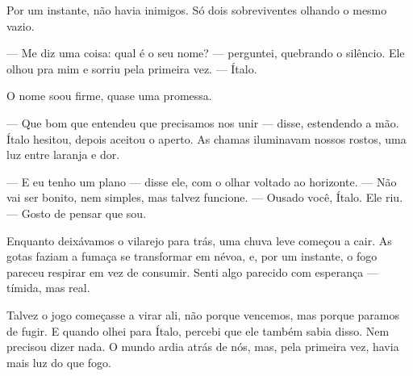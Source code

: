 Por um instante, não havia inimigos.  
Só dois sobreviventes olhando o mesmo vazio.

— Me diz uma coisa: qual é o seu nome? — perguntei, quebrando o silêncio.
Ele olhou pra mim e sorriu pela primeira vez.  
— Ítalo.

O nome soou firme, quase uma promessa.

— Que bom que entendeu que precisamos nos unir — disse, estendendo a mão.  
Ítalo hesitou, depois aceitou o aperto.
As chamas iluminavam nossos rostos, uma luz entre laranja e dor.

— E eu tenho um plano — disse ele, com o olhar voltado ao horizonte. — Não vai ser bonito, nem simples, mas talvez funcione.  
— Ousado você, Ítalo.  
Ele riu. — Gosto de pensar que sou.

Enquanto deixávamos o vilarejo para trás, uma chuva leve começou a cair.  
As gotas faziam a fumaça se transformar em névoa, e, por um instante, o fogo pareceu respirar em vez de consumir.  
Senti algo parecido com esperança — tímida, mas real.  

Talvez o jogo começasse a virar ali, não porque vencemos, mas porque paramos de fugir.  
E quando olhei para Ítalo, percebi que ele também sabia disso.  
Nem precisou dizer nada.  
O mundo ardia atrás de nós, mas, pela primeira vez, havia mais luz do que fogo.
